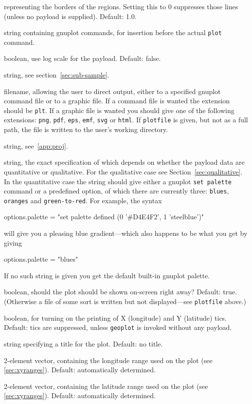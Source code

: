 \documentclass{article}
\begin{document}
\begin{description}
  representing the borders of the regions. Setting this to 0
  suppresses those lines (unless no payload is supplied). Default:
  1.0.
\item[\texttt{literal}:] string containing \textsf{gnuplot} commands,
  for insertion before the actual \texttt{plot} command.
\item[\texttt{logscale}:] boolean, use log scale for the
  payload. Default: false.
\item[\texttt{missvals}:] string, see section~\ref{sec:sub-sample}.
\item[\texttt{plotfile}:] filename, allowing the user to direct
  output, either to a specified \textsf{gnuplot} command file or to a
  graphic file. If a command file is wanted the extension should be
  \texttt{plt}. If a graphic file is wanted you should give one of the
  following extensions: \texttt{png}, \texttt{pdf}, \texttt{eps},
  \texttt{emf}, \texttt{svg} or \texttt{html}.  If \texttt{plotfile}
  is given, but not as a full path, the file is written to the user's
  working directory.
\item[\texttt{projection}:] string, see~\ref{app:proj}.
\item[\texttt{palette}:] string, the exact specification of which
  depends on whether the payload data are quantitative or
  qualitative. For the qualitative case see
  Section~\ref{sec:qualitative}. In the quantitative case the string
  should give either a \textsf{gnuplot} \texttt{set palette} command
  or a predefined option, of which there are currently three:
  \texttt{blues}, \texttt{oranges} and \texttt{green-to-red}. For
  example, the syntax
  \begin{code}
    options.palette = "set palette defined (0 '#D4E4F2', 1 'steelblue')"
  \end{code}
  will give you a pleasing blue gradient---which also happens to be
  what you get by giving
  \begin{code}
    options.palette = "blues"
  \end{code}
  If no such string is given you get the default built-in
  \textsf{gnuplot} palette.
\item[\texttt{show}:] boolean, should the plot should be shown
  on-screen right away? Default: true. (Otherwise a file of some sort
  is written but not displayed---see \texttt{plotfile} above.)
\item[\texttt{tics}:] boolean, for turning on the printing of X
  (longitude) and Y (latitude) tics. Default: tics are suppressed,
  unless \texttt{geoplot} is invoked without any payload.
\item[\texttt{title}:] string specifying a title for the
  plot. Default: no title.
\item[\texttt{xrange}:] 2-element vector, containing the longitude
  range used on the plot (see \ref{sec:xyranges}). Default:
  automatically determined.
\item[\texttt{yrange}:] 2-element vector, containing the latitude
  range used on the plot (see \ref{sec:xyranges}). Default:
  automatically determined.
\end{description}
\end{document}
